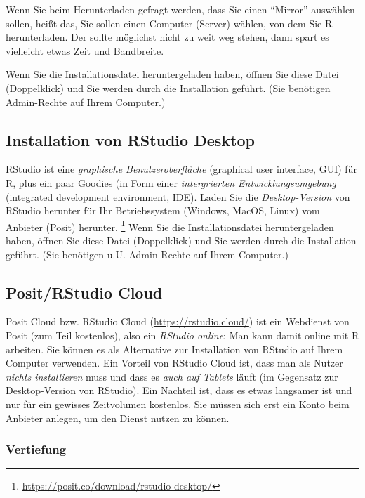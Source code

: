 \documentclass[
  letterpaper,
  oneside,
  open=any]{scrbook}
\theoremstyle{definition}
\theoremstyle{definition}
\theoremstyle{definition}
\theoremstyle{remark}
\begin{document}
Wenn Sie beim Herunterladen gefragt werden, dass Sie einen
\enquote{Mirror} auswählen sollen, heißt das, Sie sollen einen Computer
(Server) wählen, von dem Sie R herunterladen. Der sollte möglichst nicht
zu weit weg stehen, dann spart es vielleicht etwas Zeit und Bandbreite.

Wenn Sie die Installationsdatei heruntergeladen haben, öffnen Sie diese
Datei (Doppelklick) und Sie werden durch die Installation geführt. (Sie
benötigen Admin-Rechte auf Ihrem Computer.)

\subsection{Installation von RStudio
Desktop}\label{installation-von-rstudio-desktop}

RStudio ist eine \emph{graphische Benutzeroberfläche} (graphical user
interface, GUI) für R, plus ein paar Goodies (in Form einer
\emph{intergrierten Entwicklungsumgebung} (integrated development
environment, IDE). Laden Sie die \emph{Desktop-Version} von RStudio
herunter für Ihr Betriebssystem (Windows, MacOS, Linux) vom Anbieter
(Posit) herunter. \footnote{\url{https://posit.co/download/rstudio-desktop/}}
Wenn Sie die Installationsdatei heruntergeladen haben, öffnen Sie diese
Datei (Doppelklick) und Sie werden durch die Installation geführt. (Sie
benötigen u.U. Admin-Rechte auf Ihrem Computer.)

\subsection{Posit/RStudio Cloud}\label{positrstudio-cloud}

Posit Cloud bzw. RStudio Cloud (\url{https://rstudio.cloud/}) ist ein
Webdienst von Posit (zum Teil kostenlos), also ein \emph{RStudio
online}: Man kann damit online mit R arbeiten. Sie können es als
Alternative zur Installation von RStudio auf Ihrem Computer verwenden.
Ein Vorteil von RStudio Cloud ist, dass man als Nutzer \emph{nichts
installieren} muss und dass es \emph{auch auf Tablets} läuft (im
Gegensatz zur Desktop-Version von RStudio). Ein Nachteil ist, dass es
etwas langsamer ist und nur für ein gewisses Zeitvolumen kostenlos. Sie
müssen sich erst ein Konto beim Anbieter anlegen, um den Dienst nutzen
zu können.

\subsubsection{Vertiefung}\label{vertiefung-1}
\end{document}
